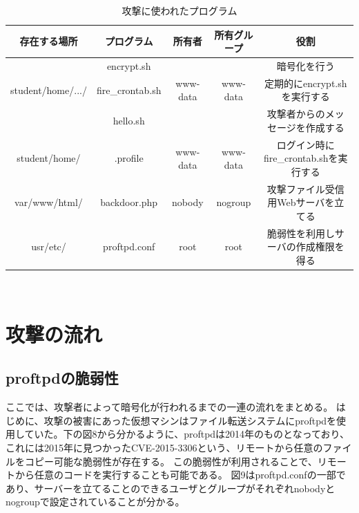 \documentclass[dvipdfmx,autodetect-engine,titlepage]{jsarticle}
\begin{document}
  \begin{table}[H]
    \centering
    \caption{攻撃に使われたプログラム}
    \begin{tabular}{|c|c|c|c|c|}
    \hline
    存在する場所                 & プログラム            & 所有者                   & 所有グループ                & 役割                          \\ \hline
                           & encrypt.sh       &                       &                       & 暗号化を行う                      \\ \cline{2-2} \cline{5-5} 
    student/home/.../      & fire\_crontab.sh & www-data              & www-data              & 定期的にencrypt.shを実行する         \\ \cline{2-2} \cline{5-5} 
    \multicolumn{1}{|l|}{} & hello.sh         & \multicolumn{1}{l|}{} & \multicolumn{1}{l|}{} & 攻撃者からのメッセージを作成する            \\ \hline
    student/home/          & .profile         & www-data              & www-data              & ログイン時にfire\_crontab.shを実行する \\ \hline
    var/www/html/          & backdoor.php     & nobody                & nogroup               & 攻撃ファイル受信用Webサーバを立てる            \\ \hline
    usr/etc/               & proftpd.conf     & root                  & root                  & 脆弱性を利用しサーバの作成権限を得る                \\ \hline
    \end{tabular}
  \end{table}
　\\
\section{攻撃の流れ}
\subsection{proftpdの脆弱性}
ここでは、攻撃者によって暗号化が行われるまでの一連の流れをまとめる。
はじめに、攻撃の被害にあった仮想マシンはファイル転送システムにproftpdを使用していた。下の図8から分かるように、proftpdは2014年のものとなっており、これには2015年に見つかったCVE-2015-3306という、リモートから任意のファイルをコピー可能な脆弱性が存在する。
この脆弱性が利用されることで、リモートから任意のコードを実行することも可能である。
図9はproftpd.confの一部であり、サーバーを立てることのできるユーザとグループがそれぞれnobodyとnogroupで設定されていることが分かる。\\\\
\end{document}
